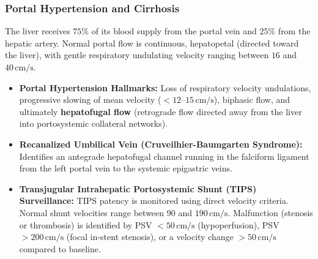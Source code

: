 \documentclass[11pt,a4paper]{article}
\begin{document}
\subsubsection{Portal Hypertension and Cirrhosis}
The liver receives $75\%$ of its blood supply from the portal vein and $25\%$ from the hepatic artery. Normal portal flow is continuous, hepatopetal (directed toward the liver), with gentle respiratory undulating velocity ranging between $16$ and $40\,\text{cm/s}$.
\begin{itemize}[leftmargin=*]
    \item \textbf{Portal Hypertension Hallmarks:} Loss of respiratory velocity undulations, progressive slowing of mean velocity ($< 12\text{--}15\,\text{cm/s}$), biphasic flow, and ultimately \textbf{hepatofugal flow} (retrograde flow directed away from the liver into portosystemic collateral networks).
    \item \textbf{Recanalized Umbilical Vein (Cruveilhier-Baumgarten Syndrome):} Identifies an antegrade hepatofugal channel running in the falciform ligament from the left portal vein to the systemic epigastric veins.
    \item \textbf{Transjugular Intrahepatic Portosystemic Shunt (TIPS) Surveillance:} TIPS patency is monitored using direct velocity criteria. Normal shunt velocities range between $90$ and $190\,\text{cm/s}$. Malfunction (stenosis or thrombosis) is identified by PSV $< 50\,\text{cm/s}$ (hypoperfusion), PSV $> 200\,\text{cm/s}$ (focal in-stent stenosis), or a velocity change $> 50\,\text{cm/s}$ compared to baseline.
\end{itemize}
\end{document}
